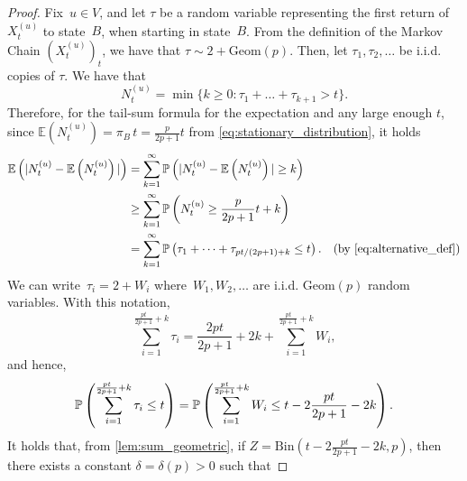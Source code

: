 \documentclass{article}
\newcommand{\Prob}[1]{\bbP\left(#1\right)}
\newcommand{\Expc}[1]{\mathbb{E}\left(#1\right)}
\begin{document}
\begin{proof}
    Fix~$u \in V$, and let $\tau$ be a random variable representing the first return of~$X_t^{(u)}$ to state~$B$, when starting in state~$B$.
    From the definition of the Markov Chain $(X_t^{(u)})_t$, we have that $\tau \sim 2 + \mathrm{Geom}(p)$. Then, let $\tau_1, \tau_2,\dots$ be i.i.d. copies of $\tau$. We have that
    \begin{equation} \label{eq:alternative_def}
        N_t^{(u)} = \min\{ k \geq 0 : \tau_1 + \dots + \tau_{k+1} > t\}.
    \end{equation}
    Therefore, for the tail-sum formula for the expectation and any large enough $t$, since $\Expc{N_t^{(u)}} = \pi_B \, t = \frac{p}{2p+1}t$ from \cref{eq:stationary_distribution}, it holds
\begin{align*}
    \Expc{|N_t^{(u)}-\Expc{N_t^{(u)}}|} &= \sum_{k=1}^{\infty} \Prob{|N_t^{(u)}-\Expc{N_t^{(u)}}| \geq k}
    \\ & \geq \sum_{k=1}^{\infty} \Prob{N_t^{(u)} \geq \frac{p}{2p+1}t + k} 
    \\ & = \sum_{k=1}^{\infty} \Prob{\tau_1+ \dots + \tau_{pt/(2p+1) + k} \leq t}. 
    & \text{(by \Cref{eq:alternative_def})}
\end{align*}
We can write~$\tau_i = 2+W_i$ where~$W_1,W_2, \dots$ are i.i.d. $\mathrm{Geom}(p)$ random variables. With this notation,
\begin{equation*}
    \sum_{i=1}^{\frac{pt}{2p+1}+k} \tau_i = \frac{2pt}{2p+1}+2k+ \sum_{i=1}^{\frac{pt}{2p+1}+k} W_i,
\end{equation*}
and hence,
\begin{equation*}
    \Prob{\sum_{i=1}^{\frac{pt}{2p+1}+k} \tau_i \leq t} = \Prob{\sum_{i=1}^{\frac{pt}{2p+1}+k}W_i \leq t- 2\frac{pt}{2p+1} - 2k}.
\end{equation*}
It holds that, from \cref{lem:sum_geometric}, if $Z = \mathrm{Bin}( t- 2\frac{pt}{2p+1} - 2k, p)$, then there exists a constant $\delta = \delta(p)>0$ such that %

\end{proof}
\end{document}
